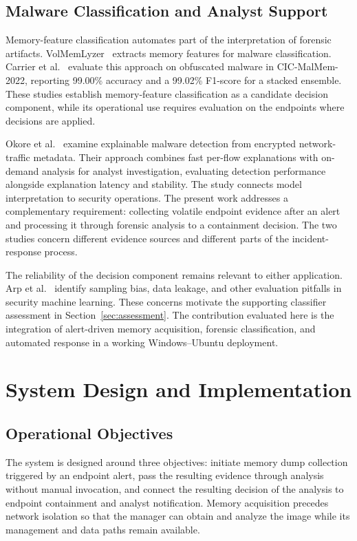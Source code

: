 \documentclass[conference]{IEEEtran}
\begin{document}
\subsection{Malware Classification and Analyst Support}
Memory-feature classification automates part of the interpretation of
forensic artifacts. VolMemLyzer~\cite{lashkari2021} extracts memory features
for malware classification. Carrier et al.~\cite{carrier2022} evaluate this
approach on obfuscated malware in CIC-MalMem-2022, reporting 99.00\% accuracy
and a 99.02\% F1-score for a stacked ensemble. These studies establish
memory-feature classification as a candidate decision component, while its
operational use requires evaluation on the endpoints where decisions are
applied.

Okore et al.~\cite{okore2026} examine explainable malware detection from
encrypted network-traffic metadata. Their approach combines fast per-flow
explanations with on-demand analysis for analyst investigation, evaluating
detection performance alongside explanation latency and stability. The study
connects model interpretation to security operations. The present work
addresses a complementary requirement: collecting volatile endpoint evidence
after an alert and processing it through forensic analysis to a containment
decision. The two studies concern different evidence sources and different
parts of the incident-response process.

The reliability of the decision component remains relevant to either
application. Arp et al.~\cite{arp2022} identify sampling bias, data leakage,
and other evaluation pitfalls in security machine learning. These concerns
motivate the supporting classifier assessment in Section~\ref{sec:assessment}.
The contribution evaluated here is the integration of alert-driven memory
acquisition, forensic classification, and automated response in a working
Windows--Ubuntu deployment.

\section{System Design and Implementation}
\label{sec:architecture}

\subsection{Operational Objectives}
The system is designed around three objectives: initiate memory dump collection triggered by an endpoint alert, pass the resulting evidence through analysis without manual invocation, and connect the resulting decision of the analysis to endpoint containment and analyst notification. Memory acquisition precedes network isolation so that the manager can obtain and analyze the image while its management and data paths remain available. 
\end{document}
